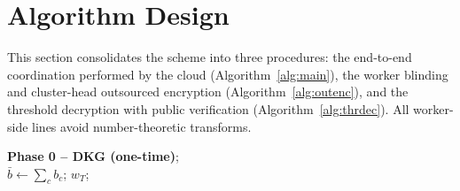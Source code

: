 \section{Algorithm Design}
\label{sec:algorithms}

This section consolidates the scheme into three procedures: the end-to-end coordination performed by the cloud (Algorithm~\ref{alg:main}), the worker blinding and cluster-head outsourced encryption (Algorithm~\ref{alg:outenc}), and the threshold decryption with public verification (Algorithm~\ref{alg:thrdec}). All worker-side lines avoid number-theoretic transforms.

\begin{algorithm}[t]
\caption{\textsc{VHD-FL} Main Procedure}
\label{alg:main}
\BlankLine
\textbf{Phase 0 -- DKG (one-time)};\\
$\bar b\gets\sum_c b_c$; 
\BlankLine
{}
\Return $w_T$;
\end{algorithm}

